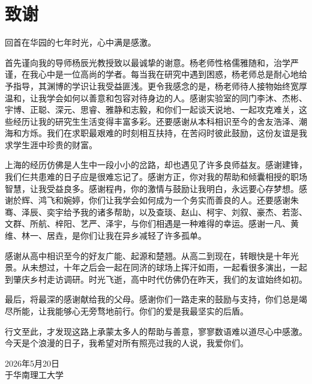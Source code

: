 \chapter{致\texorpdfstring{\quad}{}谢}

回首在华园的七年时光，心中满是感激。

首先谨向我的导师杨辰光教授致以最诚挚的谢意。杨老师性格儒雅随和，治学严谨，在我心中是一位高尚的学者。每当我在研究中遇到困惑，杨老师总是耐心地给予指导，其渊博的学识让我受益匪浅。更令我感念的是，杨老师待人接物始终宽厚温和，让我学会如何以善意和包容对待身边的人。感谢实验室的同门李沐、杰彬、宇博、正聪、深元、思睿、雅静和志毅，和你们一起谈天说地、一起攻克难关，这些经历让我的研究生生活变得丰富多彩。还要感谢从本科相识至今的舍友浩泽、潮海和方烁。我们在求职最艰难的时刻相互扶持，在苦闷时彼此鼓励，这份友谊是我求学生涯中珍贵的财富。

上海的经历仿佛是人生中一段小小的岔路，却也遇见了许多良师益友。感谢建锋，我们仨共患难的日子应是很难忘记了。感谢方正，你对我的帮助和倾囊相授的职场智慧，让我受益良多。感谢程冉，你的激情与鼓励让我明白，永远要心存梦想。感谢於辉、鸿飞和婉婷，你们让我学会如何成为一个务实而善良的人。还要感谢朱骞、泽辰、奕宇给予我的诸多帮助，以及查琰、赵山、柯宇、刘叙、豪杰、若澎、文群、所航、梓阳、艺严、泽宇，与你们相遇是一种难得的幸运。感谢一凡、黄维、林一、居垚，是你们让我在异乡减轻了许多孤单。

感谢从高中相识至今的好友广能、起源和楚翘。从高二到现在，转眼快是十年光景。从未想过，十年之后会一起在同济的球场上挥汗如雨，一起看很多演出，一起到肇庆乡村走访调研。时光飞逝，高中时代仿佛仍在昨天，我们的友谊始终如初。

最后，将最深的感谢献给我的父母。感谢你们一路走来的鼓励与支持，你们总是竭尽所能，让我能够心无旁骛地前行。你们的爱是我最坚实的后盾。

行文至此，才发现这路上承蒙太多人的帮助与善意，寥寥数语难以道尽心中感激。今天是个浪漫的日子，我希望对所有照亮过我的人说，我爱你们。

\begin{minipage}[t]{0.945\textwidth}%
	\begin{flushright}
		2026年5月20日\\
		于华南理工大学
		\par\end{flushright}
\end{minipage}

